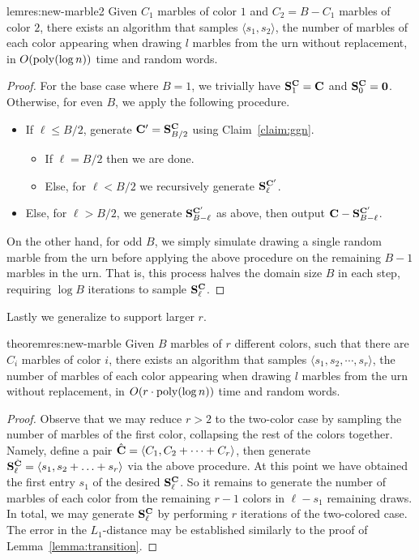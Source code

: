 \begin{restatable}{lem}{res:new-marble2}\label{thm:colors2}
Given $C_1$ marbles of color $1$ and $C_2 = B-C_1$ marbles of color $2$,
there exists an algorithm that samples $\langle s_1, s_2 \rangle$,
the number of marbles of each color appearing when drawing $l$ marbles from the urn without replacement,
in $O(\mathrm{poly}(\log n))$ time and random words.
\end{restatable}
\begin{proof}
For the base case where $B=1$, we trivially have $\mathbf{S}^{\mathbf{C}}_1=\mathbf{C}$ and $\mathbf{S}^{\mathbf{C}}_0=\mathbf{\mathbf{0}}$.
Otherwise, for even $B$, we apply the following procedure.
\begin{itemize}
\item If $\ell \leq B/2$, generate $\mathbf{C}'=\mathbf{S}^{\mathbf{C}}_{B/2}$ using Claim~\ref{claim:ggn}.
\begin{itemize}
\item If $\ell = B/2$ then we are done.
\item Else, for $\ell < B/2$ we recursively generate $\mathbf{S}^{\mathbf{C'}}_{\ell}$.
\end{itemize}
\item Else, for $\ell > B/2$, we generate $\mathbf{S}^{\mathbf{C'}}_{B-\ell}$ as above, then output $\mathbf{C}-\mathbf{S}^{\mathbf{C'}}_{B-\ell}$.
\end{itemize}
On the other hand, for odd $B$, we simply simulate drawing a single random marble
from the urn before applying the above procedure on the remaining $B-1$ marbles in the urn.
That is, this process halves the domain size $B$ in each step, requiring $\log B$ iterations to sample $\mathbf{S}^{\mathbf{C}}_\ell$.
\end{proof}

Lastly we generalize to support larger $r$.
\begin{restatable}{theorem}{res:new-marble}\label{thm:colors}
Given $B$ marbles of $r$ different colors, such that there are $C_i$ marbles of color $i$,
there exists an algorithm that samples $\langle s_1, s_2,\cdots, s_r \rangle$,
the number of marbles of each color appearing when drawing $l$ marbles from the urn without replacement,
in $O(r\cdot\mathrm{poly}(\log n))$ time and random words.
\end{restatable}
\begin{proof}
Observe that we may reduce $r>2$ to the two-color case by sampling the number of marbles of the first color,
collapsing the rest of the colors together.
Namely, define a pair $\hat{\mathbf{C}}=\langle C_1, C_2+\cdots+C_r \rangle$,
then generate $\mathbf{S}^{\hat{\mathbf{C}}}_{\ell}=\langle s_1, s_2+\ldots+s_r\rangle$ via the above procedure.
At this point we have obtained the first entry $s_1$ of the desired $\mathbf{S}^{\mathbf{C}}_{\ell}$.
So it remains to generate the number of marbles of each color from the remaining $r-1$ colors in $\ell-s_1$ remaining draws.
In total, we may generate $\mathbf{S}^{\mathbf{C}}_{\ell}$ by performing $r$ iterations of the two-colored case.
The error in the $L_1$-distance may be established similarly to the proof of Lemma~\ref{lemma:transition}.
\end{proof}

